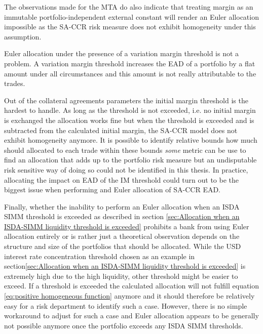 \documentclass[../Thesis_AHoecherl.tex]{subfiles}
\begin{document}
    The observations made for the \gls{MTA} do also indicate that treating margin as an immutable portfolio-independent external constant will render an Euler allocation impossible as the \gls{SA-CCR} risk measure does not exhibit homogeneity under this assumption.

    Euler allocation under the presence of a variation margin threshold is not a problem.
    A variation margin threshold increases the \gls{EAD} of a portfolio by a flat amount under all circumstances and this amount is not really attributable to the trades.

    Out of the collateral agreements parameters the initial margin threshold is the hardest to handle. As long as the threshold is not exceeded, i.e. no initial margin is exchanged the allocation works fine but when the threshold is exceeded and is subtracted from the calculated initial margin, the \gls{SA-CCR} model does not exhibit homogeneity anymore.
    It is possible to identify relative bounds how much should allocated to each trade within these bounds \emph{some} metric can be use to find an allocation that adds up to the portfolio risk measure but an undisputable risk sensitive way of doing so could not be identified in this thesis.
    In practice, allocating the impact on \gls{EAD} of the \gls{IM} threshold could turn out to be the biggest issue when performing and Euler allocation of \gls{SA-CCR} EAD.

    Finally, whether the inability to perform an Euler allocation when an \gls{ISDA SIMM} threshold is exceeded as described in section \ref{sec:Allocation when an ISDA-SIMM liquidity threshold is exceeded} prohibits a bank from using Euler allocation entirely or is rather just a theoretical observation depends on the structure and size of the portfolios that should be allocated.
    While the USD interest rate concentration threshold chosen as an example in section\ref{sec:Allocation when an ISDA-SIMM liquidity threshold is exceeded} is extremely high due to the high liquidity, other threshold might be easier to exceed. If a threshold is exceeded the calculated allocation will not fulfill equation \ref{eq:positive homogeneous function} anymore and it should therefore be relatively easy for a risk department to identify such a case. However, there is no simple workaround to adjust for such a case and Euler allocation appears to be generally not possible anymore once the portfolio exceeds any \gls{ISDA SIMM} thresholds.
\end{document}
